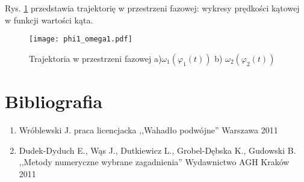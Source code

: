 \documentclass[11pt]{aghdpl}
\begin{document}
Rys. \ref{phi_omega} przedstawia trajektorię w przestrzeni fazowej: wykresy prędkości kątowej w funkcji wartości kąta. 
\begin{figure}[h!]
	\centering
	\texttt{[image: phi1\_omega1.pdf]}
	\caption{Trajektoria w przestrzeni fazowej a)$\omega_1(\varphi_1(t))$ b) $\omega_2(\varphi_2(t))$	}
	\label{phi_omega}
\end{figure}

\clearpage
\section{Bibliografia}
\renewcommand*\labelenumi{[\theenumi]}

\begin{enumerate}
\item Wróblewski J. praca licencjacka ,,Wahadło podwójne'' Warszawa 2011 \label{bib_one}
\item Dudek-Dyduch E., Wąs J., Dutkiewicz L., Grobel-Dębska K., Gudowski B. ,,Metody numeryczne wybrane zagadnienia'' Wydawnictwo AGH Kraków 2011 \label{bib_two}

\end{enumerate}
\end{document}
